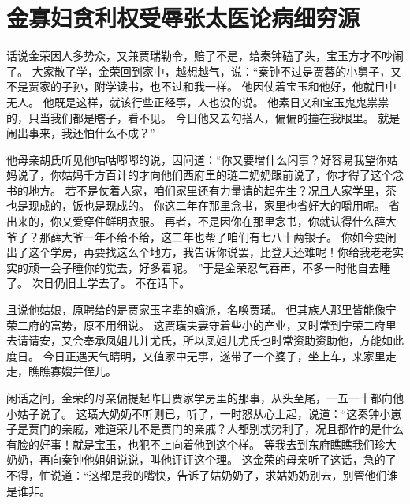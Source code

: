 \chapter{金寡妇贪利权受辱\quad 张太医论病细穷源}
\par
话说金荣因人多势众，又兼贾瑞勒令，赔了不是，给秦钟磕了头，宝玉方才不吵闹了。
大家散了学，金荣回到家中，越想越气，说：“秦钟不过是贾蓉的小舅子，又不是贾家的子孙，附学读书，也不过和我一样。
他因仗着宝玉和他好，他就目中无人。
他既是这样，就该行些正经事，人也没的说。
他素日又和宝玉鬼鬼祟祟的，只当我们都是瞎子，看不见。
今日他又去勾搭人，偏偏的撞在我眼里。
就是闹出事来，我还怕什么不成？”\par
他母亲胡氏听见他咕咕嘟嘟的说，因问道：“你又要增什么闲事？好容易我望你姑妈说了，你姑妈千方百计的才向他们西府里的琏二奶奶跟前说了，你才得了这个念书的地方。
若不是仗着人家，咱们家里还有力量请的起先生？况且人家学里，茶也是现成的，饭也是现成的。
你这二年在那里念书，家里也省好大的嚼用呢。
省出来的，你又爱穿件鲜明衣服。
再者，不是因你在那里念书，你就认得什么薛大爷了？那薛大爷一年不给不给，这二年也帮了咱们有七八十两银子。
你如今要闹出了这个学房，再要找这么个地方，我告诉你说罢，比登天还难呢！你给我老老实实的顽一会子睡你的觉去，好多着呢。
”于是金荣忍气吞声，不多一时他自去睡了。
次日仍旧上学去了。
不在话下。
\par
且说他姑娘，原聘给的是贾家玉字辈的嫡派，名唤贾璜。
但其族人那里皆能像宁荣二府的富势，原不用细说。
这贾璜夫妻守着些小的产业，又时常到宁荣二府里去请请安，又会奉承凤姐儿并尤氏，所以凤姐儿尤氏也时常资助资助他，方能如此度日。
今日正遇天气晴明，又值家中无事，遂带了一个婆子，坐上车，来家里走走，瞧瞧寡嫂并侄儿。
\par
闲话之间，金荣的母亲偏提起昨日贾家学房里的那事，从头至尾，一五一十都向他小姑子说了。
这璜大奶奶不听则已，听了，一时怒从心上起，说道：“这秦钟小崽子是贾门的亲戚，难道荣儿不是贾门的亲戚？人都别忒势利了，况且都作的是什么有脸的好事！就是宝玉，也犯不上向着他到这个样。
等我去到东府瞧瞧我们珍大奶奶，再向秦钟他姐姐说说，叫他评评这个理。
这金荣的母亲听了这话，急的了不得，忙说道：“这都是我的嘴快，告诉了姑奶奶了，求姑奶奶别去，别管他们谁是谁非。
